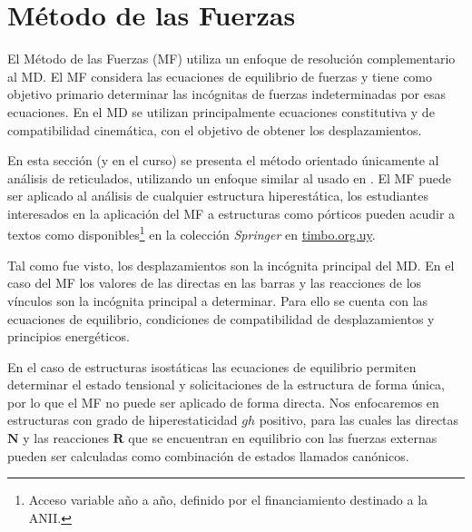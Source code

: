 \section{Método de las Fuerzas}


El Método de las Fuerzas (MF) utiliza un enfoque de resolución complementario al MD. El MF considera las ecuaciones de equilibrio de fuerzas y tiene como objetivo primario determinar las incógnitas de fuerzas indeterminadas por esas ecuaciones. %
%
En el MD se utilizan principalmente ecuaciones constitutiva y de  compatibilidad cinemática, con el objetivo de obtener los desplazamientos.


En esta sección (y en el curso) se presenta el método orientado únicamente al análisis de reticulados, utilizando un enfoque similar al usado en \citep{Reddy2002b}. %
El MF puede ser aplicado al análisis de cualquier estructura hiperestática, los estudiantes interesados en la aplicación del MF a estructuras como pórticos pueden acudir a textos como \citep{Krenk2013,Fuchs2016} disponibles\footnote{Acceso variable año a año, definido por el financiamiento destinado a la ANII.} en la colección \textit{Springer} en \href{http://timbo.org.uy/}{timbo.org.uy}.
%


Tal como fue visto, los desplazamientos son la incógnita principal del MD. %
En el caso del MF los valores de las directas en las barras y las reacciones de los vínculos son la incógnita principal a determinar. %
%
Para ello se cuenta con las ecuaciones de equilibrio, condiciones de compatibilidad de desplazamientos y principios energéticos.


En el caso de estructuras isostáticas las ecuaciones de equilibrio permiten determinar el estado tensional y solicitaciones de la estructura de forma única, por lo que el MF no puede ser aplicado de forma directa. %
%
%
Nos enfocaremos en estructuras con grado de hiperestaticidad $gh$ positivo, para las cuales las directas $\textbf{N}$ y las reacciones $\textbf{R}$ que se encuentran en equilibrio con las fuerzas externas pueden ser calculadas como combinación de estados llamados canónicos. %



